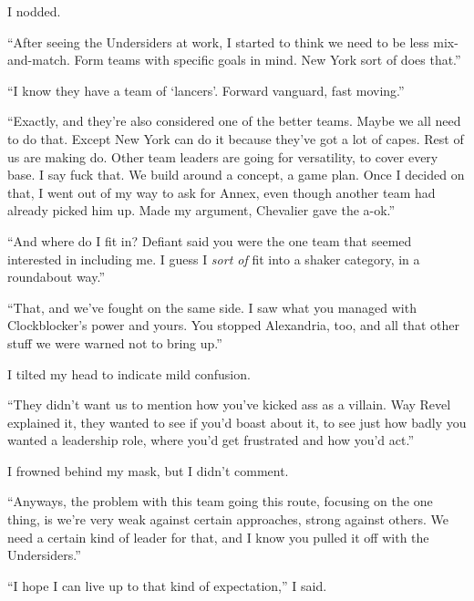 I nodded.



``After seeing the Undersiders at work, I started to think we need to be less mix-and-match.  Form teams with specific goals in mind.  New York sort of does that.''



``I know they have a team of `lancers'.  Forward vanguard, fast moving.''



``Exactly, and they're also considered one of the better teams.  Maybe we all need to do that.  Except New York can do it because they've got a lot of capes.  Rest of us are making do.  Other team leaders are going for versatility, to cover every base.  I say fuck that.  We build around a concept, a game plan.  Once I decided on that, I went out of my way to ask for Annex, even though another team had already picked him up.  Made my argument, Chevalier gave the a-ok.''



``And where do I fit in?  Defiant said you were the one team that seemed interested in including me.  I guess I \emph{sort of} fit into a shaker category, in a roundabout way.''



``That, and we've fought on the same side.  I saw what you managed with Clockblocker's power and yours.  You stopped Alexandria, too, and all that other stuff we were warned not to bring up.''



I tilted my head to indicate mild confusion.



``They didn't want us to mention how you've kicked ass as a villain.  Way Revel explained it, they wanted to see if you'd boast about it, to see just how badly you wanted a leadership role, where you'd get frustrated and how you'd act.''



I frowned behind my mask, but I didn't comment.



``Anyways, the problem with this team going this route, focusing on the one thing, is we're very weak against certain approaches, strong against others.  We need a certain kind of leader for that, and I know you pulled it off with the Undersiders.''



``I hope I can live up to that kind of expectation,'' I said.



